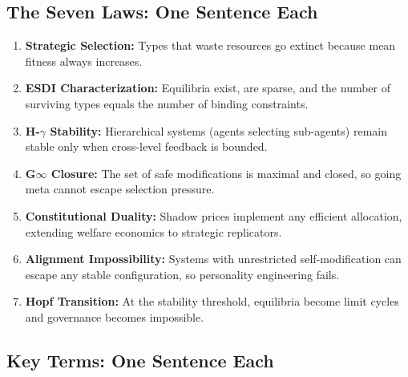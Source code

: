 \documentclass[12pt]{article}
\begin{document}
\subsection{The Seven Laws: One Sentence Each}

\begin{enumerate}
\item \textbf{Strategic Selection:} Types that waste resources go extinct because mean fitness always increases.

\item \textbf{ESDI Characterization:} Equilibria exist, are sparse, and the number of surviving types equals the number of binding constraints.

\item \textbf{H-$\gamma$ Stability:} Hierarchical systems (agents selecting sub-agents) remain stable only when cross-level feedback is bounded.

\item \textbf{G$\infty$ Closure:} The set of safe modifications is maximal and closed, so going meta cannot escape selection pressure.

\item \textbf{Constitutional Duality:} Shadow prices implement any efficient allocation, extending welfare economics to strategic replicators.

\item \textbf{Alignment Impossibility:} Systems with unrestricted self-modification can escape any stable configuration, so personality engineering fails.

\item \textbf{Hopf Transition:} At the stability threshold, equilibria become limit cycles and governance becomes impossible.
\end{enumerate}

\subsection{Key Terms: One Sentence Each}
\end{document}
